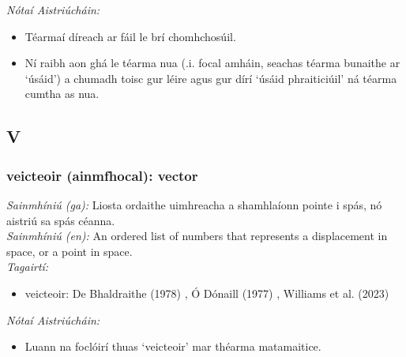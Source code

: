\documentclass{article}
\begin{document}
 \noindent \textit{Nótaí Aistriúcháin:}
\begin{itemize}
	\item Téarmaí díreach ar fáil le brí chomhchosúil.
	\item Ní raibh aon ghá le téarma nua (.i. focal amháin, seachas téarma bunaithe ar `úsáid') a chumadh toisc gur léire agus gur dírí `úsáid phraiticiúil' ná téarma cumtha as nua.
\end{itemize}


\subsection*{V}

\subsubsection*{veicteoir (ainmfhocal): vector}
 \noindent \textit{Sainmhíniú (ga):} Liosta ordaithe uimhreacha a shamhlaíonn pointe i spás, nó aistriú sa spás céanna.
\\
 \noindent \textit{Sainmhíniú (en):} An ordered list of numbers that represents a displacement in space, or a point in space.
\\
 \noindent \textit{Tagairtí:}
\begin{itemize}
	\item veicteoir: De Bhaldraithe (1978) \cite{de-bhaldraithe}, Ó Dónaill (1977) \cite{odonaill}, Williams et al. (2023) \cite{storchiste}
\end{itemize}

 \noindent \textit{Nótaí Aistriúcháin:}
\begin{itemize}
	\item Luann na foclóirí thuas `veicteoir' mar théarma matamaitice.
\end{itemize}



\newpage
\printbibliography[
title={Tagairtí},
heading=bibintoc
]
\end{document}
